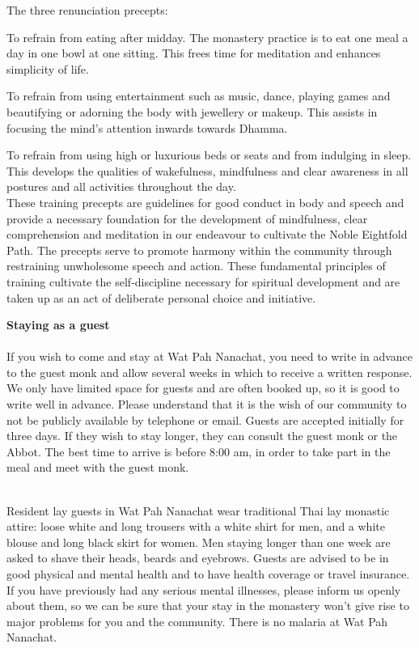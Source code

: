 The three renunciation precepts:

To refrain from eating after midday. The monastery practice is to eat
one meal a day in one bowl at one sitting. This frees time for
meditation and enhances simplicity of life.

To refrain from using entertainment such as music, dance, playing games
and beautifying or adorning the body with jewellery or makeup. This
assists in focusing the mind's attention inwards towards Dhamma.

To refrain from using high or luxurious beds or seats and from indulging
in sleep. This develops the qualities of wakefulness, mindfulness and
clear awareness in all postures and all activities throughout the day.\\
These training precepts are guidelines for good conduct in body and
speech and provide a necessary foundation for the development of
mindfulness, clear comprehension and meditation in our endeavour to
cultivate the Noble Eightfold Path. The precepts serve to promote
harmony within the community through restraining unwholesome speech and
action. These fundamental principles of training cultivate the
self-discipline necessary for spiritual development and are taken up as
an act of deliberate personal choice and initiative.

\textbf{Staying as a guest}\\\\If you wish to come and stay at Wat Pah
Nanachat, you need to write in advance to the guest monk and allow
several weeks in which to receive a written response. We only have
limited space for guests and are often booked up, so it is good to write
well in advance. Please understand that it is the wish of our community
to not be publicly available by telephone or email. Guests are accepted
initially for three days. If they wish to stay longer, they can consult
the guest monk or the Abbot. The best time to arrive is before 8:00 am,
in order to take part in the meal and meet with the guest monk.

\\Resident lay guests in Wat Pah Nanachat wear traditional Thai lay
monastic attire: loose white and long trousers with a white shirt for
men, and a white blouse and long black skirt for women. Men staying
longer than one week are asked to shave their heads, beards and
eyebrows. Guests are advised to be in good physical and mental health
and to have health coverage or travel insurance. If you have previously
had any serious mental illnesses, please inform us openly about them, so
we can be sure that your stay in the monastery won't give rise to major
problems for you and the community. There is no malaria at Wat Pah
Nanachat.

